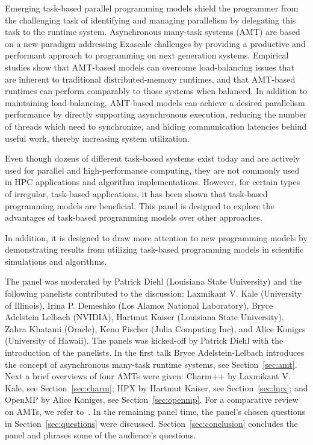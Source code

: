 \documentclass[12pt,letterpaper]{article}
\begin{document}
 Emerging task-based parallel programming models shield the programmer from the challenging task of identifying and managing parallelism by delegating this task to the runtime system. Asynchronous many-task systems (AMT) are based on a new paradigm addressing Exascale challenges by providing a productive and performant approach to programming on next generation systems. Empirical studies show that AMT-based models can overcome load-balancing issues that are inherent to traditional distributed-memory runtimes, and that AMT-based runtimes can perform comparably to those systems when balanced. In addition to maintaining load-balancing, AMT-based models can achieve a desired parallelism performance by directly supporting asynchronous execution, reducing the number of threads which need to synchronize, and hiding communication latencies behind useful work, thereby increasing system utilization.
 
Even though dozens of different task-based systems exist today and are actively used for parallel and high-performance computing, they are not commonly used in HPC applications and algorithm implementations. However, for certain types of irregular, task-based applications, it has been shown that task-based programming models are beneficial. This panel is designed to explore the advantages of task-based programming models over other approaches.

\newpage
\noindent
In addition, it is designed to draw more attention to new programming models by demonstrating results from utilizing task-based programming models in scientific simulations and algorithms.

The panel was moderated by Patrick Diehl (Louisiana State University) and the following panelists contributed to the discussion: Laxmikant V. Kale (University of Illinois), Irina P. Demeshko (Los Alamos National Laboratory), Bryce Adelstein Lelbach (NVIDIA), Hartmut Kaiser (Louisiana State University), Zahra Khatami (Oracle), Keno Fischer (Julia Computing Inc), and Alice Koniges (University of Hawaii). The panels was kicked-off by Patrick Diehl with the introduction of the panelists. In the first talk Bryce Adelstein-Lelbach introduces the concept of asynchronous many-task runtime systems, see Section~\ref{sec:amt}. Next a brief overviews of four AMTs were given: Charm++ by Laxmikant V. Kale, see Section~\ref{sec:charm}; HPX by Hartmut Kaiser, see Section~\ref{sec:hpx}; and OpenMP by Alice Koniges, see Section~\ref{sec:openmp}. For a comparative review on AMTs, we refer to~\cite{thoman2018taxonomy}. In the remaining panel time, the panel's chosen questions in Section~\ref{sec:questions} were discussed. Section~\ref{sec:conclusion} concludes the panel and phrases some of the audience's questions. 
\end{document}
